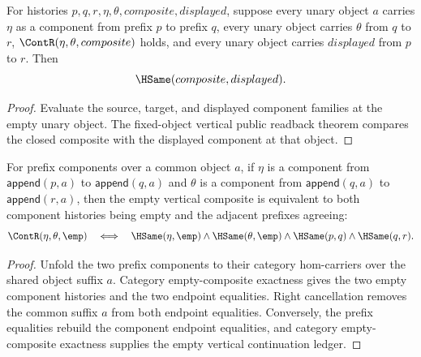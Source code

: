 \begin{theorem}
\label{thm:nattrans-prefix-component-vert-comp-family-public-readback}
For histories $p,q,r,\eta,\theta,composite,displayed$, suppose every unary
object $a$ carries $\eta$ as a component from prefix $p$ to prefix $q$, every
unary object carries $\theta$ from $q$ to $r$, $\ContR(\eta,\theta,composite)$
holds, and every unary object carries $displayed$ from $p$ to $r$. Then
$$
\HSame(composite,displayed).
$$
\end{theorem}
\begin{proof}
Evaluate the source, target, and displayed component families at the empty
unary object. The fixed-object vertical public readback theorem compares the
closed composite with the displayed component at that object.
\end{proof}

\begin{theorem}
\label{thm:nattrans-prefix-component-carrier-vert-comp-empty-iff}
For prefix components over a common object $a$, if $\eta$ is a component from
$\mathsf{append}(p,a)$ to $\mathsf{append}(q,a)$ and $\theta$ is a component
from $\mathsf{append}(q,a)$ to $\mathsf{append}(r,a)$, then the empty vertical
composite is equivalent to both component histories being empty and the
adjacent prefixes agreeing:
$$
\ContR(\eta,\theta,\emp)
\quad\Longleftrightarrow\quad
\HSame(\eta,\emp)\wedge\HSame(\theta,\emp)\wedge\HSame(p,q)\wedge\HSame(q,r).
$$
\end{theorem}
\begin{proof}
Unfold the two prefix components to their category hom-carriers over the
shared object suffix $a$. Category empty-composite exactness gives the two
empty component histories and the two endpoint equalities. Right cancellation
removes the common suffix $a$ from both endpoint equalities. Conversely, the
prefix equalities rebuild the component endpoint equalities, and category
empty-composite exactness supplies the empty vertical continuation ledger.
\end{proof}



